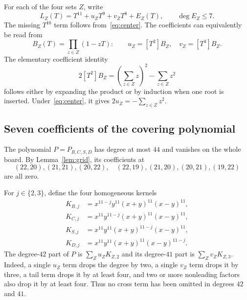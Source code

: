 \documentclass[11pt,a4paper]{article}
\theoremstyle{remark}
\newcommand{\coeff}[2]{[#1]#2}
\begin{document}
For each of the four sets $Z$, write
\begin{equation}\label{eq:rootjet}
 L_Z(T)=T^{11}+u_ZT^9+v_ZT^8+E_Z(T),\qquad\deg E_Z\leq7.
\end{equation}
The missing $T^{10}$ term follows from~\eqref{eq:center}.
The coefficients can equivalently be read from
\begin{equation}\label{eq:reverse}
 B_Z(T)=\prod_{z\in Z}(1-zT):\qquad
 u_Z=\coeff{T^2}{B_Z},\quad v_Z=\coeff{T^3}{B_Z}.
\end{equation}
The elementary coefficient identity
\begin{equation}\label{eq:newton2}
 2\coeff{T^2}{B_Z}=\left(\sum_{z\in Z}z\right)^2-\sum_{z\in Z}z^2
\end{equation}
follows either by expanding the product or by induction when one root is
inserted. Under~\eqref{eq:center}, it gives $2u_Z=-\sum_{z\in Z}z^2$.

\subsection{Seven coefficients of the covering polynomial}
The polynomial $P=P_{R,C,S,D}$ has degree at most $44$ and vanishes on the
whole board. By Lemma~\ref{lem:grid}, its coefficients at
\begin{equation}\label{eq:positions}
 (22,20),(21,21),(20,22),\quad
 (22,19),(21,20),(20,21),(19,22)
\end{equation}
are all zero.

For $j\in\{2,3\}$, define the four homogeneous kernels
\begin{align*}
 K_{R,j}&=x^{11-j}y^{11}(x+y)^{11}(x-y)^{11},\\
 K_{C,j}&=x^{11}y^{11-j}(x+y)^{11}(x-y)^{11},\\
 K_{S,j}&=x^{11}y^{11}(x+y)^{11-j}(x-y)^{11},\\
 K_{D,j}&=x^{11}y^{11}(x+y)^{11}(x-y)^{11-j}.
\end{align*}
The degree-$42$ part of $P$ is $\sum_Zu_ZK_{Z,2}$ and its degree-$41$ part is
$\sum_Zv_ZK_{Z,3}$. Indeed, a single $u_Z$ term drops the degree by two,
a single $v_Z$ term drops it by three, a tail term drops it by at least four,
and two or more nonleading factors also drop it by at least four.
Thus no cross term has been omitted in degrees $42$ and $41$.
\end{document}
